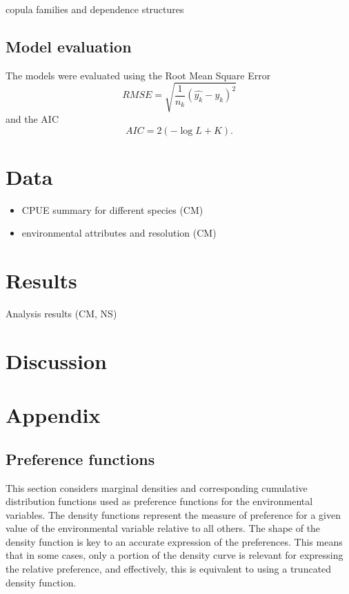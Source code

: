 \documentclass[review]{elsarticle}
\begin{document}
copula families and dependence structures 
	
	


\subsection{Model evaluation}
The models were evaluated using the Root Mean Square Error  $$ RMSE =  \sqrt{\frac{1}{n_k}(\hat{y_k} - y_k)^2}$$
and the AIC 	$$ AIC = 2 (-\log L + K).$$



\section{Data}
\begin{itemize}
	\item CPUE summary for different species (CM)
	\item environmental attributes and resolution (CM)
\end{itemize}


\section{Results}
Analysis results (CM, NS)

 \section{Discussion}


\section*{Appendix}

\subsection{Preference functions}
This section considers marginal densities and corresponding cumulative distribution functions used as preference functions for the  environmental variables.  The density functions represent the measure of preference for a given value of the environmental variable relative to all others.  The shape of the density function is key to an accurate expression of the preferences.  This means that in some cases, only a portion of the density curve is relevant for expressing the relative preference, and effectively, this is equivalent to using a truncated density function.  
\end{document}
